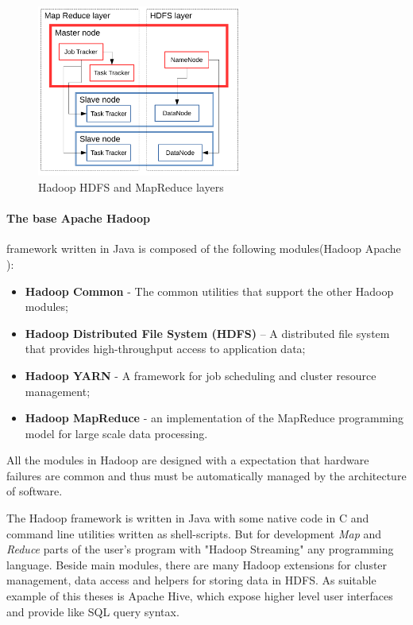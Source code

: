 \documentclass[a4paper,12pt,oneside]{report}
\begin{document}
 \begin{figure}[!htbp]
    \centering
    \includegraphics[width=0.6\textwidth]{./img/schema2.pdf}
    \caption[Hadoop architecture2]{\centering Hadoop HDFS and MapReduce layers}
 \end{figure} 
 
 
 
\paragraph*{The base Apache Hadoop}framework written in Java is composed of the following modules(Hadoop Apache \cite{hadoop_web}):
\begin{itemize}
\item \textbf{Hadoop Common} - The common utilities that support the other Hadoop modules;
\item \textbf{Hadoop Distributed File System (HDFS)} – A distributed file system that provides
 high-throughput access to application data;
\item \textbf{Hadoop YARN} - A framework for job scheduling and cluster resource management;
\item \textbf{Hadoop MapReduce} - an implementation of the MapReduce programming model 
for large scale data processing.
\end{itemize}
All the modules in Hadoop are designed with a expectation that hardware failures  are common and thus 
must be automatically managed by the architecture of  software.

The Hadoop framework is written in Java with some native code in C and command line utilities written 
as shell-scripts. But for development \textit{Map} and \textit{Reduce} parts of the user's program  
with "Hadoop Streaming" any programming language. 
Beside main modules, there are many Hadoop extensions for cluster management, 
data access and helpers for storing data in HDFS. As suitable example of this theses is Apache Hive, 
which expose higher level user interfaces and provide like SQL query syntax. 
\end{document}
